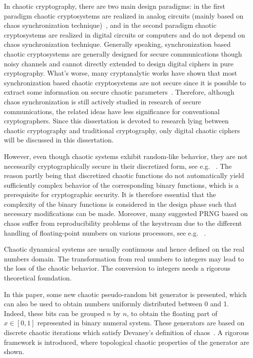 In chaotic cryptography, there are two main design paradigms: in the first
paradigm chaotic cryptosystems are realized in analog circuits (mainly based on
chaos synchronization technique)~\cite{PhysRevLett.64.821}, and in the second paradigm chaotic cryptosystems
are realized in digital circuits or computers and do not depend on
chaos synchronization technique. Generally speaking, synchronization based
chaotic cryptosystems are generally designed for secure communications though
noisy channels and cannot directly extended to design digital ciphers in pure
cryptography. What's worse, many cryptanalytic works have shown that most
synchronization based chaotic cryptosystems are not secure since it is possible
to extract some information on secure chaotic parameters~\cite{BethLaMa94}. Therefore,
although chaos synchronization is still actively studied in research of secure
communications, the related ideas have less significance for conventional cryptographers.
Since this dissertation is devoted to research lying between chaotic
cryptography and traditional cryptography, only digital chaotic ciphers will be
discussed in this dissertation.

However, even though chaotic systems exhibit
random-like behavior, they are not necessarily cryptographically secure in their discretized
form, see e.g. ~\cite{HabutsuNSM91,Biham91cryptanalysisof}. The reason partly being that discretized chaotic functions do not automatically
yield sufficiently complex behavior of the corresponding binary functions, which is
a prerequisite for cryptographic security. It is therefore essential that the complexity of the
binary functions is considered in the design phase such that necessary modifications can be
made. Moreover, many suggested PRNG based on chaos suffer from reproducibility problems
of the keystream due to the different handling of floating-point numbers on various processors,
see e.g. ~\cite{Matthews:1984}.

Chaotic dynamical systems are usually continuous and hence defined on the real numbers domain. The transformation from real numbers to integers may lead to the loss of the chaotic behavior. The conversion to integers needs a rigorous theoretical foundation.

In this paper, some new chaotic pseudo-random bit generator is presented, which can also be used to obtain numbers uniformly distributed between 0 and 1. Indeed, these bits can be grouped $n$ by $n$, to obtain the floating part of $x \in [0,1]$ represented in binary numeral system. These generators are based on discrete chaotic iterations which satisfy Devaney's definition of chaos~\cite{guyeux09}. A rigorous  framework is introduced, where topological chaotic properties of the generator are shown. 

